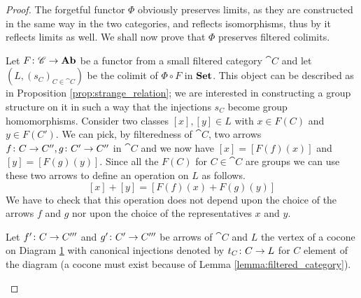 \begin{proof}
  The forgetful functor \(\Phi\) obviously preserves limits, as they are constructed in the same way in the two categories, and reflects isomorphisms, thus by \cite[Proposition 2.9.7]{handbook1} it reflects limits as well. We shall now prove that \(\Phi\) preserves filtered colimits.

  Let \(F\colon {\mathscr C}\to \text{\normalfont\textbf{Ab}}\) be a functor from a small filtered category \(\cat{C}\) and let \((L, (s_C)_{C\in\cat{C}})\) be the colimit of \(\Phi\circ F\) in \(\text{\normalfont\textbf{Set}}\).
  This object can be described as in Proposition \ref{prop:strange_relation}; we are interested in constructing a group structure on it in such a way that the injections \(s_C\) become group homomorphisms.
  Consider two classes \([x],[y]\in L\) with \(x\in F(C)\) and \(y\in F(C')\).
  We can pick, by filteredness of \(\cat{C}\), two arrows \(f\colon C\to C'',g\colon C'\to C''\) in \(\cat{C}\) and we now have \([x] = [F(f)(x)]\) and \([y] = [F(g)(y)]\).
  Since all the \(F(C)\) for \(C\in\cat{C}\) are groups we can use these two arrows to define an operation on \(L\) as follows.
  \[[x] + [y] = [F(f)(x) + F(g)(y)]\]
  We have to check that this operation does not depend upon the choice of the arrows \(f\) and \(g\) nor upon the choice of the representatives \(x\) and \(y\).

  Let \(f'\colon C\to C'''\) and \(g'\colon C'\to C'''\) be arrows of \(\cat{C}\) and \(L\) the vertex of a cocone on Diagram \ref{diagram:rel1} with canonical injections denoted by \(t_C\colon C\to L\) for \(C\) element of the diagram (a cocone must exist because of Lemma \ref{lemma:filtered_category}).
  \begin{figure}[h]
    \begin{center}
    \end{center}
    \caption{}
    \label{diagram:rel1}
  \end{figure}


\end{proof}
